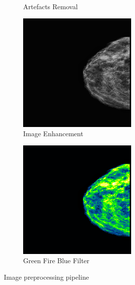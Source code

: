 \documentclass[sn-mathphys,Numbered]{sn-jnl}%
\theoremstyle{thmstyleone}%
\theoremstyle{thmstyletwo}%
\theoremstyle{thmstylethree}%
\begin{document}
\begin{figure}[ht]
\begin{subfigure}{0.22\textwidth}
    \caption{Artefacts Removal}
  \end{subfigure}%
  \hfill
  \begin{subfigure}{0.22\textwidth}
    \centering
    \includegraphics[width=\linewidth]{enhanced.png}
    \caption{Image Enhancement}
  \end{subfigure}%
  \hfill
  \begin{subfigure}{0.22\textwidth}
    \centering
    \includegraphics[width=\linewidth]{green_fire_blue.png}
    \caption{Green Fire Blue Filter}
  \end{subfigure}
  \caption{Image preprocessing pipeline}
  \label{fig:image_preprocessing}
\end{figure}
\end{document}
